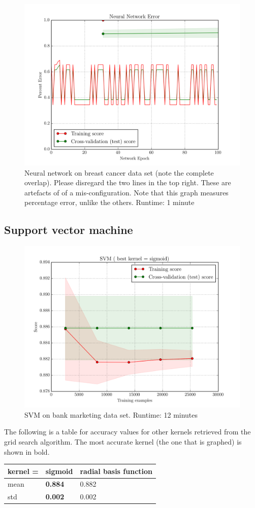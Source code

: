\begin{figure}[H]
    \centering
    \includegraphics[width=.7\textwidth]{breast/nn.png}
    \caption{Neural network on breast cancer data set (note the complete overlap). Please disregard the two lines in the top right. These are artefacts of of a mis-configuration. Note that this graph measures percentage error, unlike the others. Runtime: 1 minute}
\end{figure}

\subsection{Support vector machine}

\begin{figure}[H]
    \centering
    \includegraphics[width=.7\textwidth]{bank/svm.png}
    \caption{SVM on bank marketing data set. Runtime: 12 minutes}
\end{figure}

The following is a table for accuracy values for other kernels retrieved from the grid search algorithm.
The most accurate kernel (the one that is graphed) is shown in bold.
\begin{center}
    \begin{tabular}{l || l | l}
         kernel = & \textbf{sigmoid} & radial basis function\\
         \hline
         mean     & \textbf{0.884}   & 0.882\\
         std      & \textbf{0.002}   & 0.002
    \end{tabular}
\end{center}

